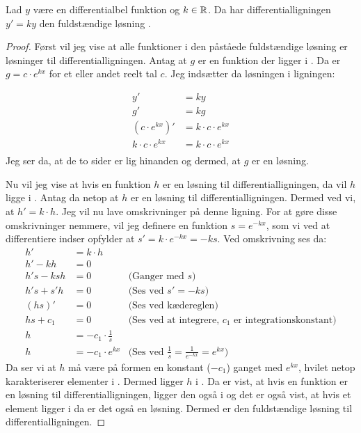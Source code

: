 \begin{thm}\label{thm:y'=k*y}
Lad $y$ være en differentialbel funktion og $k\in \mathbb{R}$. Da har  differentialligningen $y' = ky$ den fuldstændige løsning \LosEks.
\end{thm}
\begin{proof}
Først vil jeg vise at alle funktioner i den påståede fuldstændige løsning er løsninger til differentialligningen.
Antag at $g$ er en funktion der ligger i \LosEks .
Da er $g=c\cdot e^{kx}$ for et eller andet reelt tal $c$.
Jeg indsætter da løsningen i ligningen: 

\begin{align*}
y' &= ky\\
g' &= kg\\
(c\cdot e^{kx})' &= k\cdot c\cdot e^{kx}\\
k\cdot c\cdot e^{kx} &= k\cdot c\cdot e^{kx}\\
\end{align*}
Jeg ser da, at de to sider er lig hinanden og dermed, at $g$ er en løsning. 

Nu vil jeg vise at hvis en funktion $h$ er en løsning til differentialligningen, da vil $h$ ligge i \LosEks.
Antag da netop at $h$ er en løsning til differentialligningen. 
Dermed ved vi, at $h'=k\cdot h$.
Jeg vil nu lave omskrivninger på denne ligning. 
For at gøre disse omskrivninger nemmere, vil jeg definere en funktion $s=e^{-kx}$, som vi ved at differentiere indser opfylder at $s'=k \cdot e^{-kx} = -ks$.
Ved omskrivning ses da:
\begin{align*}
h'&=k\cdot h \\
h'-kh &= 0\\
h's-ksh&=0 		& \text{(Ganger med }s\text{)}\\
h's+s'h&=0		& \text{(Ses ved $s'=-ks$)}\\
(hs)'&=0		&\text{(Ses ved kædereglen)}\\
hs+c_1 &= 0		&\text{(Ses ved at integrere, $c_1$ er integrationskonstant)}\\
h&= -c_1 \cdot \frac{1}{s}\\
h&= -c_1 \cdot e^{kx} &\text{(Ses ved $\frac{1}{s}=\frac{1}{e^{-kx}} = e^{kx}$)}
\end{align*}
Da ser vi at $h$ må være på formen en konstant ($-c_1$) ganget med $e^{kx}$, hvilet netop karakteriserer elementer i \LosEks. 
Dermed ligger $h$ i \LosEks.
Da er vist, at hvis en funktion er en løsning til differentialligningen, ligger den også i \LosEks og det er også vist, at hvis et element ligger i \LosEks da er det også en løsning. 
Dermed er \LosEks den fuldstændige løsning til differentialligningen. 
\end{proof}